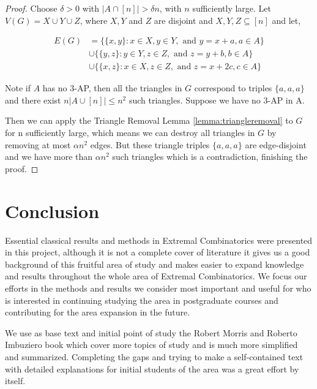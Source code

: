 \documentclass[12pt,twoside,a4paper,bibliography=totocnumbered]{book}
\numberwithin{equation}{section}
\theoremstyle{remark}
\begin{document}
\begin{proof}
Choose $\delta > 0$ with $|A \cap [n]| > \delta n$, with $n$ sufficiently large. Let $V(G) = X\cup Y \cup Z$, where $X, Y$ and $Z$ are disjoint and $X,Y,Z \subseteq [n]$ and let,

\begin{align*}
E(G) &= \{\{x,y\}\colon x \in X, y \in Y,\text{ and } y = x + a, a \in A\} \\
& \cup \{\{y,z\} \colon y \in Y, z \in Z, \text{ and } z = y + b, b \in A\}\\
& \cup \{\{x,z\} \colon x \in X, z \in Z, \text{ and } z = x +2c, c\in A\}
\end{align*}

Note if $A$ has no $3$-AP, then all the triangles in $G$ correspond to triples $\{a,a,a\}$ and there exist $n|A\cup [n]| \leq n^2$ such triangles. Suppose we have no $3$-AP in A.
 
 Then we can apply the Triangle Removal Lemma \ref{lemma:triangleremoval} to $G$ for n sufficiently large, which means we can destroy all triangles in $G$ by removing at most $\alpha n^2$ edges. But these triangle triples $\{a,a,a\}$ are edge-disjoint and we have more than $\alpha n^2 $ such triangles which is a contradiction, finishing the proof.
 
\end{proof}

\chapter{Conclusion}
Essential classical results and methods in Extremal Combinatorics were presented in this project, although it is not a complete cover of literature it gives us a good background of this fruitful area of study and makes easier to expand knowledge and results throughout the whole area of Extremal Combinatorics. We focus our efforts in the methods and results we consider most important and useful for who is interested in continuing studying the area in postgraduate courses and contributing for the area expansion in the future.

We use as base text and initial point of study the Robert Morris and Roberto Imbuziero book \cite{RoRo11} which cover more topics of study and is much more simplified and	 summarized. Completing the gaps and trying to make a self-contained text with detailed explanations for initial students of the area was a great effort by itself.






\end{document}
